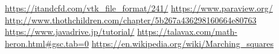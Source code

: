 \documentclass[12pt]{article}
\begin{document}
\begin{thebibliography}{99}
\url{https://itandcfd.com/vtk_file_format/241/}
\url{https://www.paraview.org/}
\url{http://www.thothchildren.com/chapter/5b267a436298160664e80763}
\url{https://www.javadrive.jp/tutorial/}
\url{https://talavax.com/math-heron.html#gsc.tab=0}
\url{https://en.wikipedia.org/wiki/Marching_squares}
\end{thebibliography}
\end{document}
